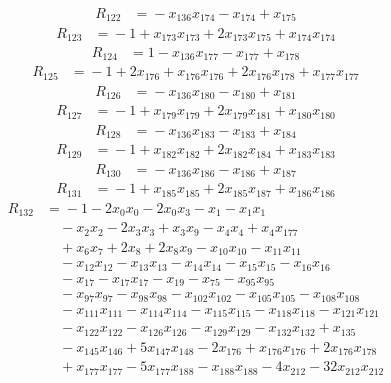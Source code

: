 \begin{align*}
R_{122}&={}-x_{136}x_{174} -x_{174} +x_{175}
\end{align*}
\begin{align*}
R_{123}&={}-1 +x_{173}x_{173} +2x_{173}x_{175} +x_{174}x_{174}
\end{align*}
\begin{align*}
R_{124}&={}1 -x_{136}x_{177} -x_{177} +x_{178}
\end{align*}
\begin{align*}
R_{125}&={}-1 +2x_{176} +x_{176}x_{176} +2x_{176}x_{178} +x_{177}x_{177}
\end{align*}
\begin{align*}
R_{126}&={}-x_{136}x_{180} -x_{180} +x_{181}
\end{align*}
\begin{align*}
R_{127}&={}-1 +x_{179}x_{179} +2x_{179}x_{181} +x_{180}x_{180}
\end{align*}
\begin{align*}
R_{128}&={}-x_{136}x_{183} -x_{183} +x_{184}
\end{align*}
\begin{align*}
R_{129}&={}-1 +x_{182}x_{182} +2x_{182}x_{184} +x_{183}x_{183}
\end{align*}
\begin{align*}
R_{130}&={}-x_{136}x_{186} -x_{186} +x_{187}
\end{align*}
\begin{align*}
R_{131}&={}-1 +x_{185}x_{185} +2x_{185}x_{187} +x_{186}x_{186}
\end{align*}
\begin{align*}
R_{132}&={}-1 -2x_{0}x_{0} -2x_{0}x_{3} -x_{1} -x_{1}x_{1}\\
&\quad{}-x_{2}x_{2} -2x_{3}x_{3} +x_{3}x_{9} -x_{4}x_{4} +x_{4}x_{177}\\
&\quad{}+x_{6}x_{7} +2x_{8} +2x_{8}x_{9} -x_{10}x_{10} -x_{11}x_{11}\\
&\quad{}-x_{12}x_{12} -x_{13}x_{13} -x_{14}x_{14} -x_{15}x_{15} -x_{16}x_{16}\\
&\quad{}-x_{17} -x_{17}x_{17} -x_{19} -x_{75} -x_{95}x_{95}\\
&\quad{}-x_{97}x_{97} -x_{98}x_{98} -x_{102}x_{102} -x_{105}x_{105} -x_{108}x_{108}\\
&\quad{}-x_{111}x_{111} -x_{114}x_{114} -x_{115}x_{115} -x_{118}x_{118} -x_{121}x_{121}\\
&\quad{}-x_{122}x_{122} -x_{126}x_{126} -x_{129}x_{129} -x_{132}x_{132} +x_{135}\\
&\quad{}-x_{145}x_{146} +5x_{147}x_{148} -2x_{176} +x_{176}x_{176} +2x_{176}x_{178}\\
&\quad{}+x_{177}x_{177} -5x_{177}x_{188} -x_{188}x_{188} -4x_{212} -32x_{212}x_{212}
\end{align*}
